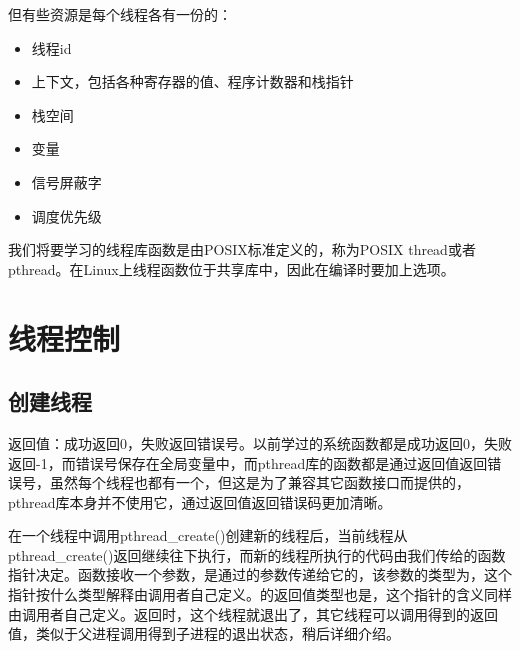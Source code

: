 但有些资源是每个线程各有一份的：


\begin{itemize}

\item 线程id

\item 上下文，包括各种寄存器的值、程序计数器和栈指针

\item 栈空间

\item {}变量

\item 信号屏蔽字

\item 调度优先级
\end{itemize}


我们将要学习的线程库函数是由POSIX标准定义的，称为POSIX thread或者pthread。在Linux上线程函数位于共享库中，因此在编译时要加上选项。




\section{线程控制}
%
\subsection{创建线程}
%



返回值：成功返回0，失败返回错误号。以前学过的系统函数都是成功返回0，失败返回-1，而错误号保存在全局变量中，而pthread库的函数都是通过返回值返回错误号，虽然每个线程也都有一个，但这是为了兼容其它函数接口而提供的，pthread库本身并不使用它，通过返回值返回错误码更加清晰。



在一个线程中调用pthread\_\BookSplit{}create()创建新的线程后，当前线程从pthread\_\BookSplit{}create()返回继续往下执行，而新的线程所执行的代码由我们传给的函数指针决定。函数接收一个参数，是通过的参数传递给它的，该参数的类型为，这个指针按什么类型解释由调用者自己定义。的返回值类型也是，这个指针的含义同样由调用者自己定义。返回时，这个线程就退出了，其它线程可以调用得到的返回值，类似于父进程调用得到子进程的退出状态，稍后详细介绍。




